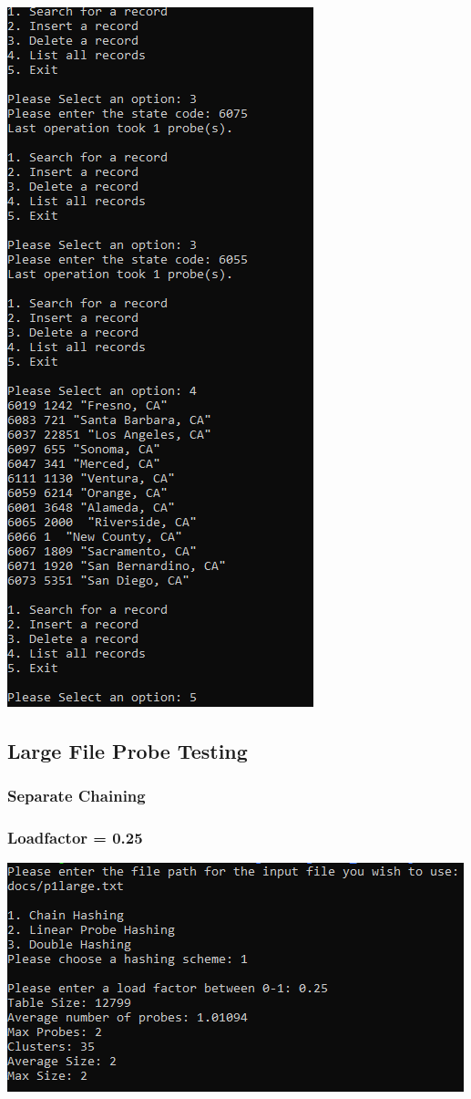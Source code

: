 \documentclass[titlepage]{article}
\begin{document}
\includegraphics[]{Small_Input/LF_0_25/DoubleHash_3.png} \newpage

\subsection{Large File Probe Testing}
\subsubsection{Separate Chaining}
\subsubsection{Loadfactor = 0.25}
\includegraphics[]{Large_Input/LF_0_25/ChainHash.png}
\end{document}
